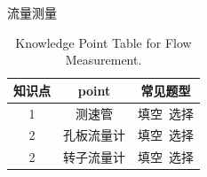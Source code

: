 \documentclass{book}
\begin{document}
\tableofcontents
\clearpage

流量测量

\begin{table}[htbp]
\centering
\begin{tabular}{c c c} 
\toprule
知识点 & point & 常见题型\\ [0.5ex] 
\midrule
1 & 测速管 & 填空~选择\\
2 & 孔板流量计 & 填空~选择\\
2 & 转子流量计 & 填空~选择\\
\bottomrule
\end{tabular}
\caption{Knowledge Point Table for Flow Measurement.}
\label{table:pipeline-knowledge}
\end{table}
\end{document}
